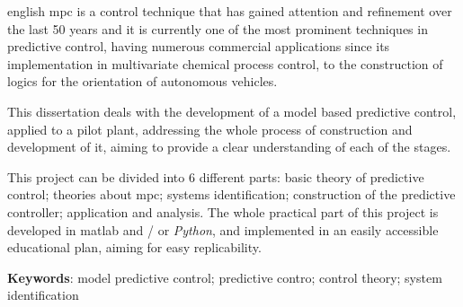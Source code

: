 \setlength{\absparsep}{18pt} %
\begin{resumo}[Abstract]
  \begin{otherlanguage*}{english}
    \acrshort{mpc} is a control technique that has gained attention and refinement over the last 50 years
    and it is currently one of the most prominent techniques in predictive control, having numerous
    commercial applications since its implementation in multivariate chemical process control,
    to the construction of logics for the orientation of autonomous vehicles.
    
    This dissertation deals with the development of a model based predictive control, applied
    to a pilot plant, addressing the whole process of construction and development of it,
    aiming to provide a clear understanding of each of the stages.
    
    This project can be divided into 6 different parts: basic theory of predictive control;
    theories about \acrshort{mpc}; systems identification; construction of the predictive controller;
    application and analysis. The whole practical part of this project is developed in \acrshort{matlab}
    and / or \textit{Python}, and implemented in an easily accessible educational plan, aiming for
    easy replicability.

    \vspace{\onelineskip}

    \noindent 
    \textbf{Keywords}: model predictive control; predictive contro; control theory; system identification
  \end{otherlanguage*}
\end{resumo}